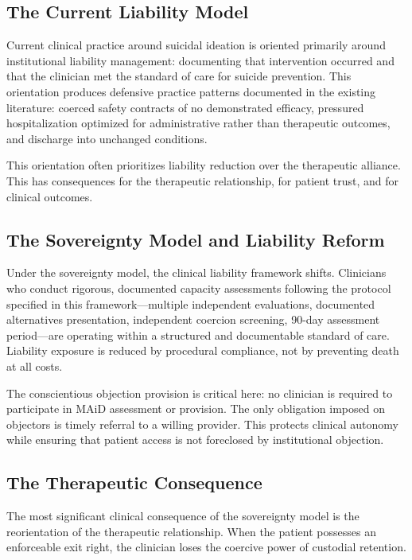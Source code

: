 \documentclass[11pt, letterpaper]{article}
\begin{document}
\subsection{The Current Liability Model}

Current clinical practice around suicidal ideation is oriented primarily around
institutional liability management: documenting that intervention occurred and that the
clinician met the standard of care for suicide prevention. This orientation produces
defensive practice patterns documented in the existing literature: coerced safety
contracts of no demonstrated efficacy, pressured hospitalization optimized for
administrative rather than therapeutic outcomes, and discharge into unchanged conditions.

This orientation often prioritizes liability reduction over the therapeutic
alliance. This has consequences for the therapeutic relationship, for patient trust,
and for clinical outcomes.

\subsection{The Sovereignty Model and Liability Reform}

Under the sovereignty model, the clinical liability framework shifts. Clinicians who
conduct rigorous, documented capacity assessments following the protocol specified in
this framework---multiple independent evaluations, documented alternatives presentation,
independent coercion screening, 90-day assessment period---are operating within a
structured and documentable standard of care. Liability exposure is reduced by
procedural compliance, not by preventing death at all costs.

The conscientious objection provision is critical here: no clinician is required to
participate in MAiD assessment or provision. The only obligation imposed on objectors
is timely referral to a willing provider. This protects clinical autonomy while
ensuring that patient access is not foreclosed by institutional objection.

\subsection{The Therapeutic Consequence}

The most significant clinical consequence of the sovereignty model is the reorientation
of the therapeutic relationship. When the patient possesses an enforceable exit right,
the clinician loses the coercive power of custodial retention.
\end{document}
